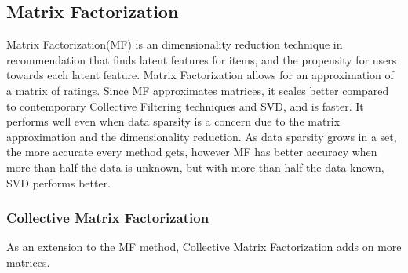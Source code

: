 \subsection{Matrix Factorization} \label{bg:matrixfactorization}
Matrix Factorization(MF) is an dimensionality reduction technique in recommendation that finds latent features for items, and the propensity for users towards each latent feature. 
Matrix Factorization allows for an approximation of a matrix of ratings.
Since MF approximates matrices, it scales better compared to contemporary Collective Filtering techniques and SVD, and is faster. It performs well even when data sparsity is a concern due to the matrix approximation and the dimensionality reduction.
As data sparsity grows in a set, the more accurate every method gets, however MF has better accuracy when more than half the data is unknown, but with more than half the data known, SVD performs better.
\subsubsection{Collective Matrix Factorization}
As an extension to the MF method, Collective Matrix Factorization adds on more matrices.
